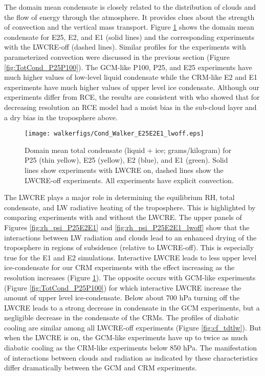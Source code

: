 \documentclass[draft]{agujournal2019}
\begin{document}
{The domain mean condensate is closely related to the distribution of clouds and the flow of energy through the atmosphere.  
It provides clues about the strength of convection and the vertical mass transport.     
Figure \ref{fig:TotCond} shows the domain mean condensate for E25, E2, and E1
(solid lines) and the corresponding experiments with the LWCRE-off (dashed lines).  Similar profiles for the experiments
with parameterized convection were discussed in the previous section (Figure \ref{fig:TotCond_P25P100}).  
The GCM-like P100, P25, and E25 experiments have much higher values of low-level liquid condensate while the CRM-like 
E2 and E1 experiments have much higher values of upper level ice condensate.  
Although our experiments differ from RCE, the results are consistent with  who showed that for 
decreasing resolution an RCE model had a moist bias in the sub-cloud layer and a dry bias in the troposphere above.  
 
\begin{figure}
  \centering
       \texttt{[image: walkerfigs/Cond\_Walker\_E25E2E1\_lwoff.eps]}
          \caption{Domain mean total condensate (liquid + ice; grams/kilogram) for P25 (thin yellow), E25 (yellow), 
          E2 (blue), and E1 (green).  Solid lines show experiments with LWCRE on,
          dashed lines show the LWCRE-off experiments.  All experiments have explicit convection.}
  \label{fig:TotCond}
\end{figure}
 
 
The LWCRE plays a major role in determining the equilibrium RH, total condensate, and LW radiative heating of the troposphere.  
This is highlighted by comparing experiments with and without the LWCRE. 
The upper panels of Figures \ref{fig:rh_psi_P25E2E1} and \ref{fig:rh_psi_P25E2E1_lwoff} show that the 
interactions between LW radiation and clouds lead to an enhanced drying of the troposphere in regions of subsidence (relative to LWCRE-off).  
This is especially true for the E1 and E2 simulations.  
Interactive LWCRE leads to less upper level ice-condensate for our CRM experiments
with the effect increasing as the resolution increases (Figure \ref{fig:TotCond}).  
The opposite occurs with GCM-like experiments (Figure \ref{fig:TotCond_P25P100}) for which interactive LWCRE increase 
the amount of upper level ice-condensate.    
Below about 700 hPa turning off the LWCRE leads to a strong decrease in condensate
in the GCM experiments, but a negligible decrease in the condensate of the CRMs.    
The profiles of diabatic cooling are similar among all LWCRE-off experiments (Figure \ref{fig:cf_tdtlw}).  
But when the LWCRE is on, the GCM-like experiments have up to twice as much diabatic cooling as the CRM-like experiments below 850 hPa.
The manifestation of interactions between clouds and radiation as indicated
by these characteristics differ dramatically between the GCM and CRM experiments.   

}
\end{document}
